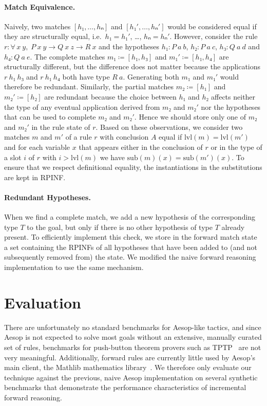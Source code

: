 \documentclass[runningheads]{llncs}
\newcommand{\All}[2]{\ensuremath{\forall\, #1,\; #2}}
\newcommand{\sub}{\ensuremath{\mathrm{sub}}}
\newcommand{\lvl}{\ensuremath{\mathrm{lvl}}}
\begin{document}
\paragraph{Match Equivalence.}
Naively, two matches $[h₁, \dots, hₙ]$ and $[h₁', \dots, hₙ']$ would be considered equal if they are structurally equal, i.e.\ $h₁ = h₁'$, \dots, $hₙ = hₙ'$.
However, consider the rule $r : \All{x~y}{P~x~y → Q~x~z → R~x}$ and the hypotheses $h₁ : P~a~b$, $h₂ : P~a~c$, $h₃ : Q~a~d$ and $h₄ : Q~a~e$.
The complete matches $m₁ ≔ [h₁, h₃]$ and $m₁' ≔ [h₁, h₄]$ are structurally different, but the difference does not matter because the applications $r~h₁~h₃$ and $r~h₁~h₄$ both have type $R~a$.
Generating both $m₁$ and $m₁'$ would therefore be redundant.
Similarly, the partial matches $m₂ ≔ [h₁]$ and $m₂' ≔ [h₂]$ are redundant because the choice between $h₁$ and $h₂$ affects neither the type of any eventual application derived from $m₂$ and $m₂'$ nor the hypotheses that can be used to complete $m₂$ and $m₂'$.
Hence we should store only one of $m₂$ and $m₂'$ in the rule state of $r$.
Based on these observations, we consider two matches $m$ and $m'$ of a rule $r$ with conclusion $A$ equal if $\lvl(m) = \lvl(m')$ and for each variable $x$ that appears either in the conclusion of $r$ or in the type of a slot $i$ of $r$ with $i > \lvl(m)$ we have $\sub(m)(x) = \sub(m')(x)$.
To ensure that we respect definitional equality, the instantiations in the substitutions are kept in RPINF.

\paragraph{Redundant Hypotheses.}
When we find a complete match, we add a new hypothesis of the corresponding type $T$ to the goal, but only if there is no other hypothesis of type $T$ already present.
To efficiently implement this check, we store in the forward match state a set containing the RPINFs of all hypotheses that have been added to (and not subsequently removed from) the state.
We modified the naive forward reasoning implementation to use the same mechanism.

\section{Evaluation}%
\label{sec:evaluation}

There are unfortunately no standard benchmarks for Aesop-like tactics, and since Aesop is not expected to solve most goals without an extensive, manually curated set of rules, benchmarks for push-button theorem provers such as TPTP~\cite{TPTP} are not very meaningful.
Additionally, forward rules are currently little used by Aesop's main client, the Mathlib mathematics library~\cite{Mathlib}.
We therefore only evaluate our technique against the previous, naive Aesop implementation on several synthetic benchmarks that demonstrate the performance characteristics of incremental forward reasoning.
\end{document}
